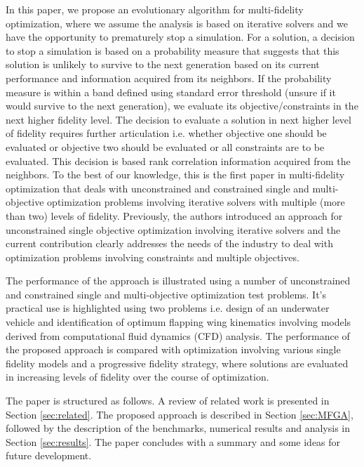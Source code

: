 In this paper, we propose an evolutionary algorithm for multi-fidelity optimization, where we assume the analysis is based on iterative solvers and we have the opportunity to prematurely stop a simulation. For a solution, a decision to stop a simulation is based on a probability measure that suggests that this solution is unlikely to survive to the next generation based on its current performance and information acquired from its neighbors. If the probability measure is within a band defined using standard error threshold (unsure if it would survive to the next generation), we evaluate its objective/constraints in the next higher fidelity level. The decision to evaluate a solution in next higher level of fidelity requires further articulation i.e. whether objective one should be evaluated or objective two should be evaluated or all constraints are to be evaluated. This decision is based rank correlation information acquired from the neighbors. To the best of our knowledge, this is the first paper in multi-fidelity optimization that deals with unconstrained and constrained single and multi-objective optimization problems involving iterative solvers with multiple (more than two) levels of fidelity. Previously, the authors introduced an approach for unconstrained single objective optimization involving iterative solvers \cite{branke2016par} and the current contribution clearly addresses the needs of the industry to deal with optimization problems involving constraints and multiple objectives.

The performance of the approach is illustrated using a number of unconstrained and constrained single and multi-objective optimization test problems. It's practical use is highlighted using two problems i.e. design of an underwater vehicle and identification of optimum flapping wing kinematics involving models derived from computational fluid dynamics (CFD) analysis. The performance of the proposed approach is compared with optimization involving various single fidelity models and a progressive fidelity strategy, where solutions are evaluated in increasing levels of fidelity over the course of optimization.  

The paper is structured as follows. A review of related work is presented in Section \ref{sec:related}. The proposed approach is described in Section \ref{sec:MFGA}, followed by the description of the benchmarks, numerical results and analysis in Section \ref{sec:results}. The paper concludes with a summary and some ideas for future development.

